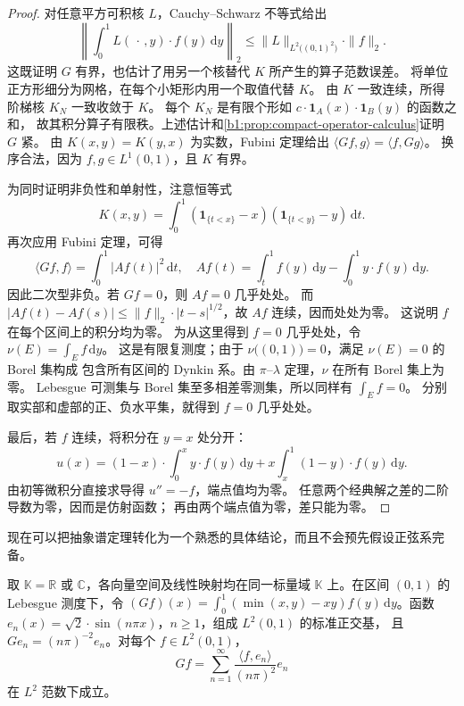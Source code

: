 \begin{proof}
对任意平方可积核 \(L\)，Cauchy--Schwarz 不等式给出
\[
 \left\|\int_0^1L(\,\cdot\,,y)\cdot f(y)\,\mathrm{d}y\right\|_2
 \leq \|L\|_{L^2\bigl((0,1)^2\bigr)}\cdot\|f\|_2.
\]
这既证明 \(G\) 有界，也估计了用另一个核替代 \(K\) 所产生的算子范数误差。
将单位正方形细分为网格，在每个小矩形内用一个取值代替 \(K\)。
由 \(K\) 一致连续，所得阶梯核 \(K_N\) 一致收敛于 \(K\)。
每个 \(K_N\) 是有限个形如 \(c\cdot\mathbf1_A(x)\cdot\mathbf1_B(y)\) 的函数之和，
故其积分算子有限秩。上述估计和\cref{b1:prop:compact-operator-calculus}证明 \(G\) 紧。
由 \(K(x,y)=K(y,x)\) 为实数，Fubini 定理给出%
\(\langle Gf,g\rangle=\langle f,Gg\rangle\)。
换序合法，因为 \(f,g\in L^1(0,1)\)，且 \(K\) 有界。

为同时证明非负性和单射性，注意恒等式
\[
 K(x,y)=\int_0^1(\mathbf1_{\{t<x\}}-x)(\mathbf1_{\{t<y\}}-y)\,\mathrm{d}t.
\]
再次应用 Fubini 定理，可得
\[
 \langle Gf,f\rangle=\int_0^1|Af(t)|^2\,\mathrm{d}t,\quad
 Af(t)=\int_t^1 f(y)\,\mathrm{d}y-\int_0^1y\cdot f(y)\,\mathrm{d}y.
\]
因此二次型非负。若 \(Gf=0\)，则 \(Af=0\) 几乎处处。
而 \(|Af(t)-Af(s)|\leq\|f\|_2\cdot|t-s|^{1/2}\)，故 \(Af\) 连续，因而处处为零。
这说明 \(f\) 在每个区间上的积分均为零。
为从这里得到 \(f=0\) 几乎处处，令 \(\nu(E)=\int_E f\,\mathrm{d}y\)。
这是有限复测度；由于 \(\nu\bigl((0,1)\bigr)=0\)，满足 \(\nu(E)=0\) 的 Borel 集构成
包含所有区间的 Dynkin 系。由 \(\pi\)--\(\lambda\) 定理，\(\nu\) 在所有 Borel 集上为零。
Lebesgue 可测集与 Borel 集至多相差零测集，所以同样有 \(\int_E f=0\)。
分别取实部和虚部的正、负水平集，就得到 \(f=0\) 几乎处处。

最后，若 \(f\) 连续，将积分在 \(y=x\) 处分开：
\[
 u(x)=(1-x)\cdot\int_0^x y\cdot f(y)\,\mathrm{d}y
       +x\int_x^1(1-y)\cdot f(y)\,\mathrm{d}y.
\]
由初等微积分直接求导得 \(u''=-f\)，端点值均为零。
任意两个经典解之差的二阶导数为零，因而是仿射函数；
再由两个端点值为零，差只能为零。
\end{proof}

现在可以把抽象谱定理转化为一个熟悉的具体结论，而且不会预先假设正弦系完备。

\begin{corollary}[区间上的正弦展开]
\label{b1:cor:dirichlet-sine-basis}
取 \(\mathbb K=\mathbb R\) 或 \(\mathbb C\)，各向量空间及线性映射均在同一标量域 \(\mathbb K\) 上。在区间 \((0,1)\) 的 Lebesgue 测度下，令 \((Gf)(x)=\int_0^1(\min(x,y)-xy)f(y)\,\mathrm dy\)。函数 \(e_n(x)=\sqrt2\cdot \sin(n\pi x)\)，\(n\geq1\)，组成 \(L^2(0,1)\) 的标准正交基，
且 \(Ge_n=(n\pi)^{-2}e_n\)。对每个 \(f\in L^2(0,1)\)，
\[
 Gf=\sum_{n=1}^{\infty}
       \frac{\langle f,e_n\rangle}{(n\pi)^2}e_n
\]
在 \(L^2\) 范数下成立。
\end{corollary}


